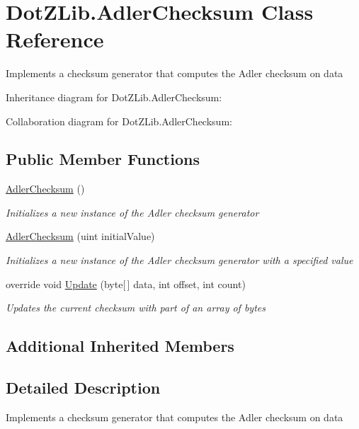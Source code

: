 \hypertarget{class_dot_z_lib_1_1_adler_checksum}{\section{Dot\+Z\+Lib.\+Adler\+Checksum Class Reference}
\label{class_dot_z_lib_1_1_adler_checksum}
}


Implements a checksum generator that computes the Adler checksum on data  




Inheritance diagram for Dot\+Z\+Lib.\+Adler\+Checksum\+:


Collaboration diagram for Dot\+Z\+Lib.\+Adler\+Checksum\+:
\subsection*{Public Member Functions}
\begin{DoxyCompactItemize}
\item 
\hyperlink{class_dot_z_lib_1_1_adler_checksum_a8b968384065103a827ac7bfb7bfab66d}{Adler\+Checksum} ()
\begin{DoxyCompactList}\small\item\em Initializes a new instance of the Adler checksum generator \end{DoxyCompactList}\item 
\hyperlink{class_dot_z_lib_1_1_adler_checksum_ab983bcafef50a5f578398d2aa83d7433}{Adler\+Checksum} (uint initial\+Value)
\begin{DoxyCompactList}\small\item\em Initializes a new instance of the Adler checksum generator with a specified value \end{DoxyCompactList}\item 
override void \hyperlink{class_dot_z_lib_1_1_adler_checksum_a757dd32613c477dcb7384b206b72fc34}{Update} (byte\mbox{[}$\,$\mbox{]} data, int offset, int count)
\begin{DoxyCompactList}\small\item\em Updates the current checksum with part of an array of bytes \end{DoxyCompactList}\end{DoxyCompactItemize}
\subsection*{Additional Inherited Members}


\subsection{Detailed Description}
Implements a checksum generator that computes the Adler checksum on data 



